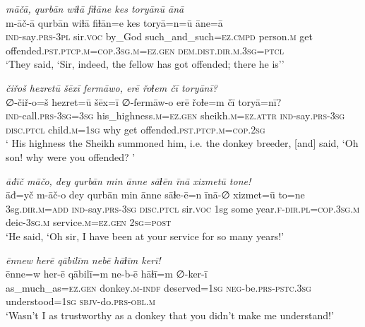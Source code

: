\ea \label{HB.76}
\textit{māčā, qurbān wiɫā fiɫāne kes toryānū ānā} \\ 
\gll m-āč-ā qurbān wiɫā fiɫān=e kes toryā=n=ū āne=ā \\ 
 \textsc{ind-}say\textsc{.prs}\textsc{-3pl} sir.\textsc{voc} by\_God such\_and\_such\textsc{=ez}\textsc{.cmpd} person\textsc{.m} get offended\textsc{.pst}\textsc{.ptcp}\textsc{.m}\textsc{=cop}\textsc{.3sg}\textsc{.m}\textsc{=ez}\textsc{.gen} \textsc{dem.dist}\textsc{.dir}\textsc{.m}\textsc{.3sg}=\textsc{ptcl} \\ 
\glt `They said, ‘Sir, indeed, the fellow has got offended; there he is’'
\z 
 
\ea \label{HB.80}
\textit{čiřoš hezretū šēxī fermāwo, erē řoɫem čī toryānī?} \\ 
\gll ∅-čiř-o=š hezret=ū šēx=ī ∅-fermāw-o erē řoɫe=m čī toryā=nī? \\ 
 \textsc{ind-}call\textsc{.prs}\textsc{-3sg}\textsc{=3sg} his\_highness\textsc{.m}\textsc{=ez}\textsc{.gen} sheikh\textsc{.m}\textsc{=ez}.\textsc{attr} \textsc{ind-}say\textsc{.prs}\textsc{-3sg} \textsc{disc.ptcl} child\textsc{.m}\textsc{=1sg} why get offended\textsc{.pst}\textsc{.ptcp}\textsc{.m}\textsc{=cop}\textsc{.\textsc{2sg}} \\ 
\glt ` His highness the Sheikh summoned him, i.e. the donkey breeder, [and] said, ‘Oh son! why were you offended? '
\z 
 
\ea \label{HB.82}
\textit{āđīč māčo, dey qurbān min ānne sāɫēn īnā xizmetū tone!} \\ 
\gll āđ=yč m-āč-o dey qurbān min ānne sāɫe-ē=n īnā-∅ xizmet=ū to=ne \\ 
 3sg\textsc{.dir}\textsc{.m}\textsc{=add} \textsc{ind-}say\textsc{.prs}\textsc{-3sg} \textsc{disc.ptcl} sir.\textsc{voc} 1sg some year\textsc{\textsc{.f}}\textsc{-dir}\textsc{.pl}\textsc{=cop}\textsc{.3sg}\textsc{.m} deic\textsc{-3sg}\textsc{.m} service\textsc{.m}\textsc{=ez}\textsc{.gen} \textsc{2sg}\textsc{=\textsc{post}} \\ 
\glt `He said, ‘Oh sir, I have been at your service for so many years!'
\z 
 
\ea \label{HB.83}
\textit{ēnnew herē qābilīm nebē hāɫīm kerī!} \\ 
\gll ēnne=w her-ē qābilī=m ne-b-ē hāɫī=m ∅-ker-ī \\ 
 as\_much\_as\textsc{=ez}\textsc{.gen} donkey\textsc{.m}\textsc{-indf} deserved\textsc{=1sg} \textsc{neg-}be\textsc{.prs}\textsc{-pstc}\textsc{.3sg} understood\textsc{=1sg} \textsc{sbjv-}do\textsc{.prs}\textsc{-obl}\textsc{.m} \\ 
\glt `Wasn’t I as trustworthy as a donkey that you didn’t make me understand!'
\z 
 
